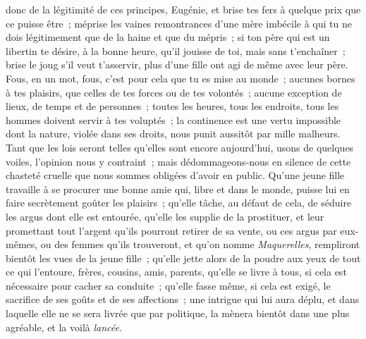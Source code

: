 \documentclass[french,twoside]{book} %
\begin{document}
donc de la légitimité de ces principes, Eugénie, et brise tes fers à quelque prix que ce puisse être ; méprise les vaines remontrances d’une mère imbécile à qui tu ne dois légitimement que de la haine et que du mépris ; si ton père qui est un libertin te désire, à la bonne heure, qu’il jouisse de toi, mais sans t’enchaîner ; brise le joug s’il veut t’asservir, plus d’une fille ont agi de même avec leur père. Fous, en un mot, fous, c’est pour cela que tu es mise au monde ; aucunes bornes à tes plaisirs, que celles de tes forces ou de tes volontés ; aucune exception de lieux, de temps et de personnes ; toutes les heures, tous les endroits, tous les hommes doivent servir à tes voluptés ; la continence est une vertu impossible dont la nature, violée dans ses droits, nous punit aussitôt par mille malheurs. Tant que les lois seront telles qu’elles sont encore aujourd’hui, usons de quelques voiles, l’opinion nous y contraint ; mais dédommageons-nous en silence de cette chasteté cruelle que nous sommes obligées d’avoir en public. Qu’une jeune fille travaille à se procurer une bonne amie qui, libre et dans le monde, puisse lui en faire secrètement goûter les plaisirs ; qu’elle tâche, au défaut de cela, de séduire les argus dont elle est entourée, qu’elle les supplie de la prostituer, et leur promettant tout l’argent qu’ils pourront retirer de sa vente, ou ces argus par eux-mêmes, ou des femmes qu’ils trouveront, et qu’on nomme {\itshape Maquerelles}, rempliront bientôt les vues de la jeune fille ; qu’elle jette alors de la poudre aux yeux de tout ce qui l’entoure, frères, cousins, amis, parents, qu’elle se livre à tous, si cela est nécessaire pour cacher sa conduite ; qu’elle fasse même, si cela est exigé, le sacrifice de ses goûts et de ses affections ; une intrigue qui lui aura déplu, et dans laquelle elle ne se sera livrée que par politique, la mènera bientôt dans une plus agréable, et la voilà {\itshape lancée}.\par
\end{document}
